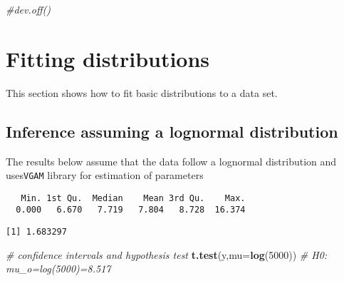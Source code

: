 \documentclass[]{book}
\newenvironment{Shaded}{\begin{snugshade}}{\end{snugshade}}
\newcommand{\KeywordTok}[1]{\textcolor[rgb]{0.13,0.29,0.53}{\textbf{#1}}}
\newcommand{\DataTypeTok}[1]{\textcolor[rgb]{0.13,0.29,0.53}{#1}}
\newcommand{\DecValTok}[1]{\textcolor[rgb]{0.00,0.00,0.81}{#1}}
\newcommand{\StringTok}[1]{\textcolor[rgb]{0.31,0.60,0.02}{#1}}
\newcommand{\CommentTok}[1]{\textcolor[rgb]{0.56,0.35,0.01}{\textit{#1}}}
\newcommand{\OperatorTok}[1]{\textcolor[rgb]{0.81,0.36,0.00}{\textbf{#1}}}
\newcommand{\NormalTok}[1]{#1}
\theoremstyle{definition}
\theoremstyle{definition}
\theoremstyle{definition}
\theoremstyle{remark}
\begin{document}
\begin{Shaded}
\begin{Highlighting}[]
\CommentTok{#dev.off()}
\end{Highlighting}
\end{Shaded}

\section{Fitting distributions}\label{fitting-distributions}

This section shows how to fit basic distributions to a data set.

\subsection{Inference assuming a lognormal
distribution}\label{inference-assuming-a-lognormal-distribution}

The results below assume that the data follow a lognormal distribution
and uses\texttt{VGAM} library for estimation of parameters

\begin{Shaded}
\end{Shaded}

\begin{verbatim}
   Min. 1st Qu.  Median    Mean 3rd Qu.    Max. 
  0.000   6.670   7.719   7.804   8.728  16.374 
\end{verbatim}

\begin{verbatim}
[1] 1.683297
\end{verbatim}

\begin{Shaded}
\begin{Highlighting}[]
\CommentTok{# confidence intervals and hypothesis test}
\KeywordTok{t.test}\NormalTok{(y,}\DataTypeTok{mu=}\KeywordTok{log}\NormalTok{(}\DecValTok{5000}\NormalTok{))   }\CommentTok{# H0: mu_o=log(5000)=8.517}
\end{Highlighting}
\end{Shaded}
\end{document}
